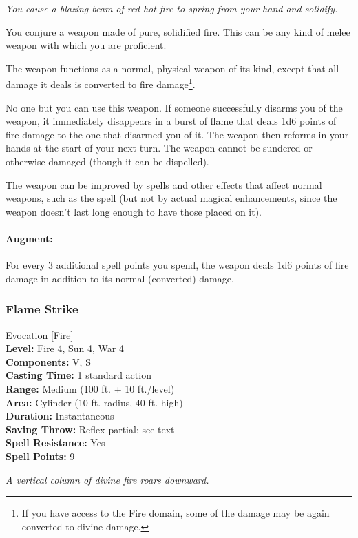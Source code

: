 \emph{You cause a blazing beam of red-hot fire to spring from your hand and solidify.}

You conjure a weapon made of pure, solidified fire.
This can be any kind of melee weapon with which you are proficient.

The weapon functions as a normal, physical weapon of its kind, except that all damage it deals is converted to fire damage\footnote{If you have access to the Fire domain, some of the damage may be again converted to divine damage.}.

No one but you can use this weapon. If someone successfully disarms you of the weapon, it immediately disappears in a burst of flame that deals 1d6 points of fire damage to the one that disarmed you of it.
The weapon then reforms in your hands at the start of your next turn.
The weapon cannot be sundered or otherwise damaged (though it can be dispelled).

The weapon can be improved by spells and other effects that affect normal weapons, such as the  spell (but not by actual magical enhancements, since the weapon doesn't last long enough to have those placed on it). 

\paragraph{Augment:} For every 3 additional spell points you spend, the weapon deals 1d6 points of fire damage in addition to its normal (converted) damage.
\subsubsection{Flame Strike}
\label{Spell:FlameStrike}
Evocation [Fire]
\\ \textbf{Level:} Fire 4, Sun 4, War 4
\\ \textbf{Components:} V, S
\\ \textbf{Casting Time:} 1 standard action
\\ \textbf{Range:} Medium (100 ft. + 10 ft./level)
\\ \textbf{Area:} Cylinder (10-ft. radius, 40 ft. high)
\\ \textbf{Duration:} Instantaneous
\\ \textbf{Saving Throw:} Reflex partial; see text
\\ \textbf{Spell Resistance:} Yes
\\ \textbf{Spell Points:} 9

\emph{A vertical column of divine fire roars downward.}

